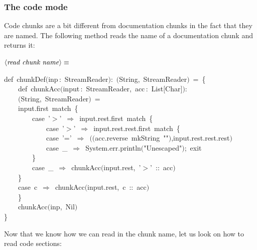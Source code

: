 \documentclass[a4paper,12pt]{article}
\begin{document}
\subsubsection{The code mode}
Code chunks are a bit different from documentation chunks in the fact that
they are named. The following method reads the name of a documentation chunk
and returns it:

$\left<\mbox{\emph{read chunk name}}\right>\equiv$
\begin{program}{\vem def}~chunkDef$($inp\,{\rm :}~StreamReader$)${\rm :}~$($String,~StreamReader$)$~=~{\small\{}
\\~~~~{\vem def}~chunkAcc$($input\,{\rm :}~StreamReader,~acc\,{\rm :}~List$[$Char$]$$)${\rm :}
\\~~~~$($String,~StreamReader$)$~=
\\~~~~input.first~{\vem match}~{\small\{}
\\~~~~~~~~{\vem case}~'$>$'~$\Rightarrow$~input.rest.first~{\vem match}~{\small\{}
\\~~~~~~~~~~~~{\vem case}~'$>$'~$\Rightarrow$~input.rest.rest.first~{\vem match}~{\small\{}
\\~~~~~~~~~~~~{\vem case}~'='~$\Rightarrow$~$($$($acc.reverse~mkString~""$)$,input.rest.rest.rest$)$
\\~~~~~~~~~~~~{\vem case}~\_~$\Rightarrow$~System.err.println$($"Unescaped"$)$;~exit
\\~~~~~~~~{\small\}}
\\~~~~~~~~{\vem case}~\_~$\Rightarrow$~chunkAcc$($input.rest,~'$>$'~{\rm :}{\rm :}~acc$)$
\\~~~~{\small\}}
\\~~~~{\vem case}~c~$\Rightarrow$~chunkAcc$($input.rest,~c~{\rm :}{\rm :}~acc$)$
\\~~~~{\small\}}
\\[0.5em]~~~~chunkAcc$($inp,~Nil$)$
\\{\small\}}
\\[0.5em]\end{program}



Now that we know how we can read in the chunk name, let us look on how to
read code sections:
\end{document}
